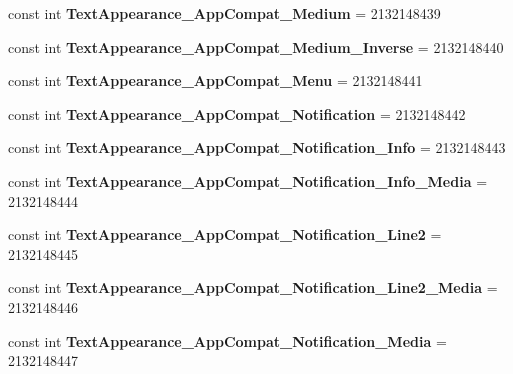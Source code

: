\begin{DoxyCompactItemize}
const int {\bfseries Text\+Appearance\+\_\+\+App\+Compat\+\_\+\+Medium} = 2132148439
\item 
\mbox{\label{classst_delivery_1_1_resource_1_1_style_ac1eaa1a43a991fbdf45d3ba0d45218bb}} 
const int {\bfseries Text\+Appearance\+\_\+\+App\+Compat\+\_\+\+Medium\+\_\+\+Inverse} = 2132148440
\item 
\mbox{\label{classst_delivery_1_1_resource_1_1_style_a34f4b78afc58c6bc8e35ae26fed13432}} 
const int {\bfseries Text\+Appearance\+\_\+\+App\+Compat\+\_\+\+Menu} = 2132148441
\item 
\mbox{\label{classst_delivery_1_1_resource_1_1_style_accd2ec00d089e02e2319313c3e61a27c}} 
const int {\bfseries Text\+Appearance\+\_\+\+App\+Compat\+\_\+\+Notification} = 2132148442
\item 
\mbox{\label{classst_delivery_1_1_resource_1_1_style_a9e920533d7e7f13b9163f63b70483d2b}} 
const int {\bfseries Text\+Appearance\+\_\+\+App\+Compat\+\_\+\+Notification\+\_\+\+Info} = 2132148443
\item 
\mbox{\label{classst_delivery_1_1_resource_1_1_style_a68f1c8140e61f17a97e790408c84be54}} 
const int {\bfseries Text\+Appearance\+\_\+\+App\+Compat\+\_\+\+Notification\+\_\+\+Info\+\_\+\+Media} = 2132148444
\item 
\mbox{\label{classst_delivery_1_1_resource_1_1_style_a23f4e98f050d93a97be9ecdd1ce409cd}} 
const int {\bfseries Text\+Appearance\+\_\+\+App\+Compat\+\_\+\+Notification\+\_\+\+Line2} = 2132148445
\item 
\mbox{\label{classst_delivery_1_1_resource_1_1_style_a465efb87983af4d9764c2d7d69802982}} 
const int {\bfseries Text\+Appearance\+\_\+\+App\+Compat\+\_\+\+Notification\+\_\+\+Line2\+\_\+\+Media} = 2132148446
\item 
\mbox{\label{classst_delivery_1_1_resource_1_1_style_a4351d50c8dddaa54ef96b881be444ebd}} 
const int {\bfseries Text\+Appearance\+\_\+\+App\+Compat\+\_\+\+Notification\+\_\+\+Media} = 2132148447

\end{DoxyCompactItemize}

